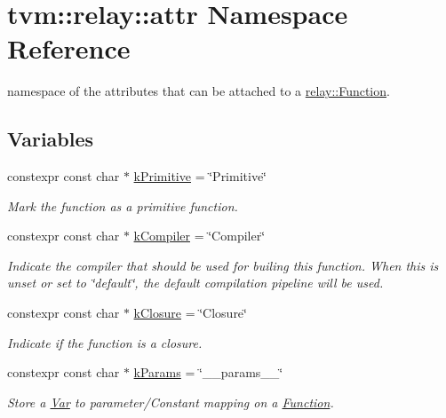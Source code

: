 \hypertarget{namespacetvm_1_1relay_1_1attr}{}\section{tvm\+:\+:relay\+:\+:attr Namespace Reference}
\label{namespacetvm_1_1relay_1_1attr}


namespace of the attributes that can be attached to a \hyperlink{classtvm_1_1relay_1_1Function}{relay\+::\+Function}.  


\subsection*{Variables}
\begin{DoxyCompactItemize}
\item 
constexpr const char $\ast$ \hyperlink{namespacetvm_1_1relay_1_1attr_ac3c86a7b4b9e64aed0da4b8294278484}{k\+Primitive} = \char`\"{}Primitive\char`\"{}
\begin{DoxyCompactList}\small\item\em Mark the function as a primitive function. \end{DoxyCompactList}\item 
constexpr const char $\ast$ \hyperlink{namespacetvm_1_1relay_1_1attr_a0cc8498ce2c4e0ffd3b2814f65799148}{k\+Compiler} = \char`\"{}Compiler\char`\"{}
\begin{DoxyCompactList}\small\item\em Indicate the compiler that should be used for builing this function. When this is unset or set to \char`\"{}default\char`\"{}, the default compilation pipeline will be used. \end{DoxyCompactList}\item 
constexpr const char $\ast$ \hyperlink{namespacetvm_1_1relay_1_1attr_aef553198f20f8cd26b73cdfa61baec2a}{k\+Closure} = \char`\"{}Closure\char`\"{}
\begin{DoxyCompactList}\small\item\em Indicate if the function is a closure. \end{DoxyCompactList}\item 
constexpr const char $\ast$ \hyperlink{namespacetvm_1_1relay_1_1attr_a3cd72e0efb5bcba623c8af8cf0f5314d}{k\+Params} = \char`\"{}\+\_\+\+\_\+params\+\_\+\+\_\+\char`\"{}
\begin{DoxyCompactList}\small\item\em Store a \hyperlink{classtvm_1_1relay_1_1Var}{Var} to parameter/\+Constant mapping on a \hyperlink{classtvm_1_1relay_1_1Function}{Function}. \end{DoxyCompactList}\item 

\end{DoxyCompactItemize}
